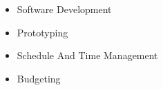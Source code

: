 
  \begin{itemize}
    \setlength\itemsep{-0.3em}
    \item Software Development
    \item Prototyping
    \item Schedule And Time Management
    \item Budgeting
  \end{itemize}
